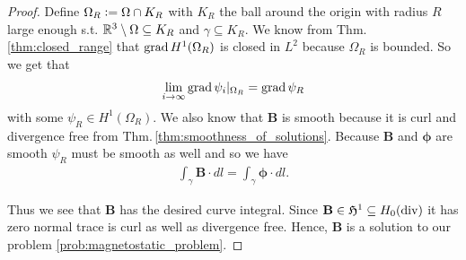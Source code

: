 \documentclass[../master_thesis.tex]{subfiles}
\begin{document}
\begin{proof}
    Define $\Omega_R \vcentcolon= \Omega \cap K_R$ with $K_R$ the ball around the origin 
    with radius $R$ large enough s.t. $\mathbb{R}^3 \setminus \Omega \subseteq K_R$ and 
    $\gamma \subseteq K_R$. 
    We know from Thm.\,\ref{thm:closed_range} 
    that $\operatorname{grad} H^1(\Omega_R)$ is closed in $L^2$ because $\Omega_R$ is bounded. 
    So we get that 
    \begin{align*}
        \lim\limits_{i\rightarrow \infty}\operatorname{grad} \psi_i|_{\Omega_R} = \operatorname{grad} \psi_R
    \end{align*}
    with some $\psi_R \in H^1(\Omega_R)$. We also know that $\mathbf{B}$ is smooth because 
    it is curl and divergence free from Thm.\,\ref{thm:smoothness_of_solutions}. 
    Because $\mathbf{B}$ and $\bm{\phi}$ are smooth
    $\psi_R$ must be smooth as well and so we have   
    \begin{align*}
        \int_\gamma \mathbf{B}\cdot dl = \int_\gamma \bm{\phi}\cdot dl.
    \end{align*}

    Thus we see that $\mathbf{B}$ has the desired curve integral. Since 
    $\mathbf{B} \in \mathfrak{H}^1 \subseteq H_0(\operatorname{div})$ it has zero normal trace 
    is curl as well as divergence free. Hence, $\mathbf{B}$ is a solution to our problem 
    \ref{prob:magnetostatic_problem}.
\end{proof}
\end{document}
